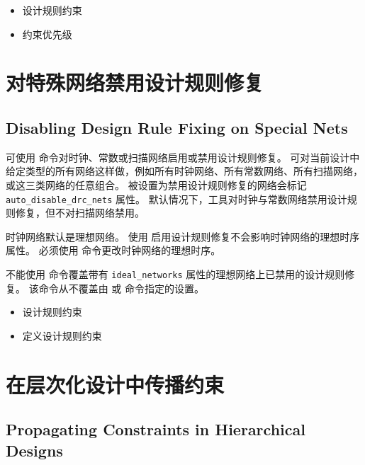 \begin{seeAlsoBox}
\begin{itemize}
  \item 设计规则约束
  \item 约束优先级
\end{itemize}
\end{seeAlsoBox}

\section{对特殊网络禁用设计规则修复}
\subsection*{Disabling Design Rule Fixing on Special Nets}

可使用  命令对时钟、常数或扫描网络启用或禁用设计规则修复。
可对当前设计中给定类型的所有网络这样做，例如所有时钟网络、所有常数网络、所有扫描网络，或这三类网络的任意组合。
被设置为禁用设计规则修复的网络会标记 \texttt{auto\_disable\_drc\_nets} 属性。
默认情况下，工具对时钟与常数网络禁用设计规则修复，但不对扫描网络禁用。

\begin{noteBox}
时钟网络默认是理想网络。
使用  启用设计规则修复不会影响时钟网络的理想时序属性。
必须使用  命令更改时钟网络的理想时序。
\end{noteBox}

不能使用  命令覆盖带有 \texttt{ideal\_networks} 属性的理想网络上已禁用的设计规则修复。
该命令从不覆盖由  或  命令指定的设置。

\begin{seeAlsoBox}
\begin{itemize}
  \item 设计规则约束
  \item 定义设计规则约束
\end{itemize}
\end{seeAlsoBox}

\section{在层次化设计中传播约束}
\subsection*{Propagating Constraints in Hierarchical Designs}

